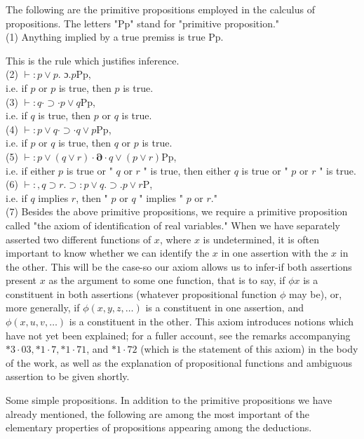 \documentclass[10pt]{article}
\begin{document}
The following are the primitive propositions employed in the calculus of propositions. The letters "Pp" stand for "primitive proposition."\\
(1) Anything implied by a true premiss is true Pp.

This is the rule which justifies inference.\\
(2) $\vdash: p \vee p$. ɔ.$p \mathrm{Pp}$,\\
i.e. if $p$ or $p$ is true, then $p$ is true.\\
(3) $\vdash: q \cdot \supset \cdot p \vee q \mathrm{Pp}$,\\
i.e. if $q$ is true, then $p$ or $q$ is true.\\
(4) $\vdash: p \vee q \cdot \supset \cdot q \vee p \mathrm{Pp}$,\\
i.e. if $p$ or $q$ is true, then $q$ or $p$ is true.\\
(5) $\vdash: p \vee(q \vee r) \cdot \boldsymbol{\partial} \cdot q \vee(p \vee r) \mathrm{Pp}$,\\
i.e. if either $p$ is true or " $q$ or $r$ " is true, then either $q$ is true or " $p$ or $r$ " is true.\\
(6) $\vdash:, q \supset r . \supset: p \vee q . \supset . p \vee r \mathrm{P}$,\\
i.e. if $q$ implies $r$, then " $p$ or $q$ " implies " $p$ or $r$."\\
(7) Besides the above primitive propositions, we require a primitive proposition called "the axiom of identification of real variables." When we have separately asserted two different functions of $x$, where $x$ is undetermined, it is often important to know whether we can identify the $x$ in one assertion with the $x$ in the other. This will be the case-so our axiom allows us to infer-if both assertions present $x$ as the argument to some one function, that is to say, if $\phi x$ is a constituent in both assertions (whatever propositional function $\phi$ may be), or, more generally, if $\phi(x, y, z, \ldots)$ is a constituent in one assertion, and $\phi(x, u, v, \ldots)$ is a constituent in the other. This axiom introduces notions which have not yet been explained; for a fuller account, see the remarks accompanying $* 3 \cdot 03, * 1 \cdot 7, * 1 \cdot 71$, and $* 1 \cdot 72$ (which is the statement of this axiom) in the body of the work, as well as the explanation of propositional functions and ambiguous assertion to be given shortly.

Some simple propositions. In addition to the primitive propositions we have already mentioned, the following are among the most important of the elementary properties of propositions appearing among the deductions.
\end{document}
